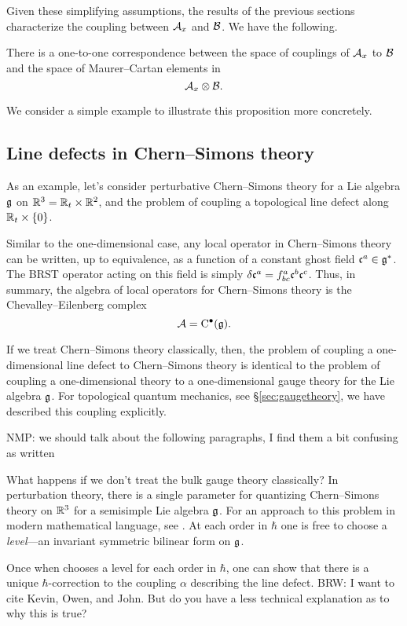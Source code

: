 \documentclass[11pt]{amsart}
\def\brian#1{{\textcolor{blue!65!red}{BRW: {#1}}}}
\def\natalie#1{{\textcolor{green!65!black}{NMP: {#1}}}}
\begin{document}
Given these simplifying assumptions, the results of the previous sections characterize the coupling between $\mathcal A_x$ and $\mathcal B$.
We have the following.

\begin{prop}\label{prop:line}
There is a one-to-one correspondence between the space of couplings of $\mathcal A_x$ to $\mathcal B$ and the space of Maurer--Cartan elements in 
\[
\mathcal A_x \otimes \mathcal B .
\]
\end{prop}

We consider a simple example to illustrate this proposition more concretely. 

\subsection{Line defects in Chern--Simons theory}

As an example, let's consider perturbative Chern--Simons theory for a Lie algebra $\mathfrak g$ on $\mathbb R^3 = \mathbb R_t \times \mathbb R^2$, and the problem of coupling a topological 
line defect along $\mathbb R_t \times \{0\}$. 

Similar to the one-dimensional case, any local operator in Chern--Simons theory can be written, up to equivalence, as a function of a constant ghost field $\mathfrak c^a \in \mathfrak g^*$. 
The BRST operator acting on this field is simply $\delta \mathfrak c^a = f^a_{bc} \mathfrak c^b \mathfrak c^c$. 
Thus, in summary, the algebra of local operators for Chern--Simons theory is the Chevalley--Eilenberg complex 
\[
\mathcal A = {\rm C}^\bullet(\mathfrak g) .
\]

If we treat Chern--Simons theory classically, then, the problem of coupling a one-dimensional line defect to Chern--Simons theory is identical to the problem of coupling a one-dimensional theory to a one-dimensional gauge theory for the Lie algebra $\mathfrak g$.
For topological quantum mechanics, see \S \ref{sec:gaugetheory}, we have described this coupling explicitly. 

\natalie{we should talk about the following paragraphs, I find them a bit confusing as written}

What happens if we don't treat the bulk gauge theory classically? In perturbation theory, there is a single parameter for quantizing Chern--Simons theory on $\mathbb R^3$ for a semisimple Lie algebra $\mathfrak g$. For an approach to this problem in modern mathematical language, see \cite[Chapter 5]{CosRenorm}. 
At each order in $\hbar$ one is free to choose a {\em level}---an invariant symmetric bilinear form on $\mathfrak g$.

Once when chooses a level for each order in $\hbar$, one can show that there is a unique $\hbar$-correction to the coupling $\alpha$ describing the line defect. \brian{I want to cite Kevin, Owen, and John. But do you have a less technical explanation as to why this is true?}
\end{document}
